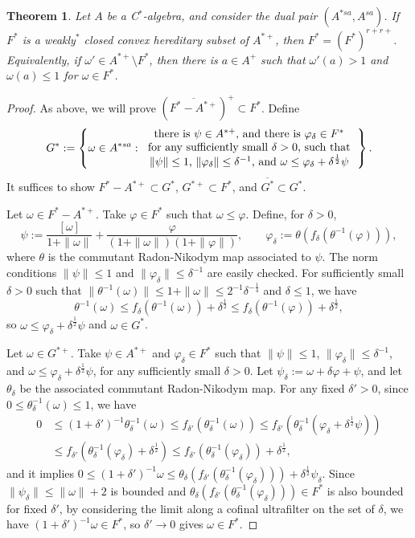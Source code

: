 \documentclass[noamsfonts,a4paper,10pt]{amsart}
\theoremstyle{plain}
\newtheorem{theorem}{Theorem}[section]
\theoremstyle{definition}
\begin{document}
\begin{theorem}
Let $A$ be a C$^*$-algebra, and consider the dual pair $(A^{*sa},A^{sa})$.
If $F^*$ is a weakly$^*$ closed convex hereditary subset of $A^{*+}$, then $F^*=(F^*)^{r+r+}$.
Equivalently, if $\omega'\in A^{*+}\setminus F^*$, then there is $a\in A^+$ such that $\omega'(a)>1$ and $\omega(a)\le1$ for $\omega\in F^*$.
\end{theorem}
\begin{proof}
As above, we will prove $(\overline{F^*-A^{*+}})^+\subset F^*$.
Define
\[G^*:=\left\{\omega\in A^{*sa}:\begin{tabular}{c}
there is $\psi\in A^{*+}$, and there is $\varphi_\delta\in F^*$ \\
for any sufficiently small $\delta>0$,
such that\\
$\|\psi\|\le1$, $\|\varphi_\delta\|\le\delta^{-1}$, and $\omega\le\varphi_\delta+\delta^{\frac12}\psi$
\end{tabular}\right\}.\]
It suffices to show $F^*-A^{*+}\subset G^*$, $G^{*+}\subset F^*$, and $\overline{G^*}\subset G^*$.

Let $\omega\in F^*-A^{*+}$.
Take $\varphi\in F^*$ such that $\omega\le\varphi$.
Define, for $\delta>0$,
\[\psi:=\frac{[\omega]}{1+\|\omega\|}+\frac\varphi{(1+\|\omega\|)(1+\|\varphi\|)},\qquad\varphi_\delta:=\theta(f_\delta(\theta^{-1}(\varphi))),\]
where $\theta$ is the commutant Radon-Nikodym map associated to $\psi$.
The norm conditions $\|\psi\|\le1$ and $\|\varphi_\delta\|\le\delta^{-1}$ are easily checked.
For sufficiently small $\delta>0$ such that $\|\theta^{-1}(\omega)\|\le1+\|\omega\|\le2^{-1}\delta^{-\frac14}$ and $\delta\le1$, we have
\[\theta^{-1}(\omega)\le f_\delta(\theta^{-1}(\omega))+\delta^{\frac12}\le f_\delta(\theta^{-1}(\varphi))+\delta^{\frac12},\]
so $\omega\le\varphi_\delta+\delta^{\frac12}\psi$ and $\omega\in G^*$.

Let $\omega\in G^{*+}$.
Take $\psi\in A^{*+}$ and $\varphi_\delta\in F^*$ such that $\|\psi\|\le1$, $\|\varphi_\delta\|\le\delta^{-1}$, and $\omega\le\varphi_\delta+\delta^{\frac12}\psi$, for any sufficiently small $\delta>0$.
Let $\psi_\delta:=\omega+\delta\varphi+\psi$, and let $\theta_\delta$ be the associated commutant Radon-Nikodym map.
For any fixed $\delta'>0$, since $0\le\theta_\delta^{-1}(\omega)\le1$, we have
\begin{align*}
0&\le(1+\delta')^{-1}\theta_\delta^{-1}(\omega)\le f_{\delta'}(\theta_\delta^{-1}(\omega))\le f_{\delta'}(\theta_\delta^{-1}(\varphi_\delta+\delta^{\frac12}\psi))\\
&\le f_{\delta'}(\theta_\delta^{-1}(\varphi_\delta)+\delta^{\frac12})\le f_{\delta'}(\theta_\delta^{-1}(\varphi_\delta))+\delta^{\frac12},
\end{align*}
and it implies $0\le(1+\delta')^{-1}\omega\le\theta_\delta(f_{\delta'}(\theta_\delta^{-1}(\varphi_\delta)))+\delta^{\frac12}\psi_\delta$.
Since $\|\psi_\delta\|\le\|\omega\|+2$ is bounded and $\theta_\delta(f_{\delta'}(\theta_\delta^{-1}(\varphi_\delta)))\in F^*$ is also bounded for fixed $\delta'$, by considering the limit along a cofinal ultrafilter on the set of $\delta$, we have $(1+\delta')^{-1}\omega\in F^*$, so $\delta'\to0$ gives $\omega\in F^*$.


\end{proof}
\end{document}

